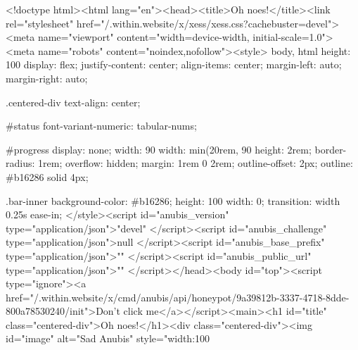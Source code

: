 <!doctype html><html lang="en"><head><title>Oh noes!</title><link rel="stylesheet" href="/.within.website/x/xess/xess.css?cachebuster=devel"><meta name="viewport" content="width=device-width, initial-scale=1.0"><meta name="robots" content="noindex,nofollow"><style>
        body,
        html {
            height: 100%
            display: flex;
            justify-content: center;
            align-items: center;
            margin-left: auto;
            margin-right: auto;
        }

        .centered-div {
            text-align: center;
        }

        #status {
            font-variant-numeric: tabular-nums;
        }

        #progress {
            display: none;
            width: 90%
            width: min(20rem, 90%
            height: 2rem;
            border-radius: 1rem;
            overflow: hidden;
            margin: 1rem 0 2rem;
            outline-offset: 2px;
            outline: #b16286 solid 4px;
        }

        .bar-inner {
            background-color: #b16286;
            height: 100%
            width: 0;
            transition: width 0.25s ease-in;
        }
    	</style><script id="anubis_version" type="application/json">"devel"
</script><script id="anubis_challenge" type="application/json">null
</script><script id="anubis_base_prefix" type="application/json">""
</script><script id="anubis_public_url" type="application/json">""
</script></head><body id="top"><script type="ignore"><a href="/.within.website/x/cmd/anubis/api/honeypot/9a39812b-3337-4718-8dde-800a78530240/init">Don't click me</a></script><main><h1 id="title" class="centered-div">Oh noes!</h1><div class="centered-div"><img id="image" alt="Sad Anubis" style="width:100%